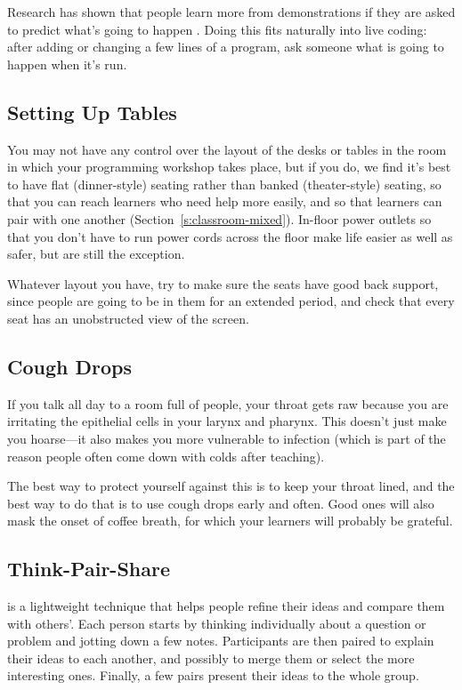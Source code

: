 Research has shown that people learn more from demonstrations if they
are asked to predict what's going to happen \cite{Mill2013}. Doing
this fits naturally into live coding: after adding or changing a few
lines of a program, ask someone what is going to happen when it's run.

\subsection*{Setting Up Tables}

You may not have any control over the layout of the desks or tables in
the room in which your programming workshop takes place, but if you do,
we find it's best to have flat (dinner-style) seating rather than banked
(theater-style) seating, so that you can reach learners who need help
more easily, and so that learners can pair with one another
(Section~\ref{s:classroom-mixed}). In-floor power outlets so that you
don't have to run power cords across the floor make life easier as
well as safer, but are still the exception.

Whatever layout you have, try to make sure the seats have good back
support, since people are going to be in them for an extended period,
and check that every seat has an unobstructed view of the screen.

\subsection*{Cough Drops}

If you talk all day to a room full of people, your throat gets raw
because you are irritating the epithelial cells in your larynx and
pharynx. This doesn't just make you hoarse---it also makes you more
vulnerable to infection (which is part of the reason people often come
down with colds after teaching).

The best way to protect yourself against this is to keep your throat
lined, and the best way to do that is to use cough drops early and
often. Good ones will also mask the onset of coffee breath, for which
your learners will probably be grateful.

\subsection*{Think-Pair-Share}

 is a lightweight technique
that helps people refine their ideas and compare them with
others'. Each person starts by thinking individually about a question
or problem and jotting down a few notes. Participants are then paired
to explain their ideas to each another, and possibly to merge them or
select the more interesting ones. Finally, a few pairs present their
ideas to the whole group.

